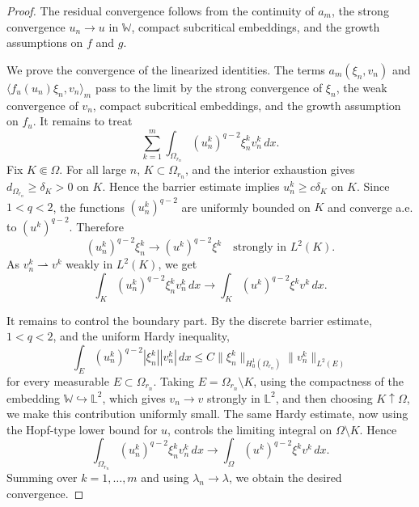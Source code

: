 \documentclass[preprint,10pt]{elsarticle}
\numberwithin{equation}{section}
\begin{document}
\begin{proof}
	The residual convergence follows from the continuity of \(a_m\), the
	strong convergence \(u_n\to u\) in \(\mathbb W\), compact subcritical
	embeddings, and the growth assumptions on \(f\) and \(g\).
	
	We prove the convergence of the linearized identities. The terms
	\(a_m(\xi_n,v_n)\) and
	\(\langle f_u(u_n)\xi_n,v_n\rangle_m\) pass to the limit by the strong
	convergence of \(\xi_n\), the weak convergence of \(v_n\), compact
	subcritical embeddings, and the growth assumption on \(f_u\). It remains to
	treat
	\[
	\sum_{k=1}^m
	\int_{\Omega_{r_n}}
	(u_n^k)^{q-2}\xi_n^k v_n^k\,dx .
	\]
	Fix \(K\Subset\Omega\). For all large \(n\), \(K\subset\Omega_{r_n}\), and
	the interior exhaustion gives \(d_{\Omega_{r_n}}\ge\delta_K>0\) on \(K\).
	Hence the barrier estimate implies \(u_n^k\ge c\delta_K\) on \(K\). Since
	\(1<q<2\), the functions \((u_n^k)^{q-2}\) are uniformly bounded on \(K\)
	and converge a.e. to \((u^k)^{q-2}\). Therefore
	\[
	(u_n^k)^{q-2}\xi_n^k
	\to
	(u^k)^{q-2}\xi^k
	\quad\text{strongly in }L^2(K).
	\]
	As \(v_n^k\rightharpoonup v^k\) weakly in \(L^2(K)\), we get
	\[
	\int_K (u_n^k)^{q-2}\xi_n^k v_n^k\,dx
	\to
	\int_K (u^k)^{q-2}\xi^k v^k\,dx .
	\]
	
	It remains to control the boundary part. By the discrete barrier estimate,
	\(1<q<2\), and the uniform Hardy inequality,
	\[
	\int_E (u_n^k)^{q-2}|\xi_n^k||v_n^k|\,dx
	\le
	C\|\xi_n^k\|_{H_0^1(\Omega_{r_n})}\|v_n^k\|_{L^2(E)}
	\]
	for every measurable \(E\subset\Omega_{r_n}\). Taking
	\(E=\Omega_{r_n}\setminus K\), using the compactness of the embedding
	\(\mathbb W\hookrightarrow\mathbb L^2\), which gives
	\(v_n\to v\) strongly in \(\mathbb L^2\), and then choosing
	\(K\uparrow\Omega\), we make this contribution uniformly small. The same
	Hardy estimate, now using the Hopf-type lower bound for \(u\), controls the
	limiting integral on \(\Omega\setminus K\). Hence
	\[
	\int_{\Omega_{r_n}}
	(u_n^k)^{q-2}\xi_n^k v_n^k\,dx
	\to
	\int_\Omega
	(u^k)^{q-2}\xi^k v^k\,dx .
	\]
	Summing over \(k=1,\ldots,m\) and using \(\lambda_n\to\lambda\), we obtain
	the desired convergence.
\end{proof}
\end{document}
